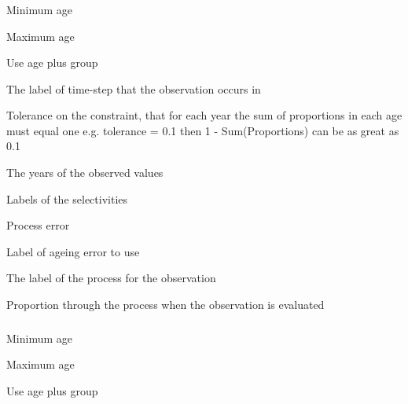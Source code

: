 \subsubsection[Process Proportions At Age]{}

 {Minimum age}

 {Maximum age}

 {Use age plus group}

 {The label of time-step that the observation occurs in}

 {Tolerance on the constraint, that for each year the sum of proportions in each age must equal one e.g. tolerance = 0.1 then 1 - Sum(Proportions) can be as great as 0.1}

 {The years of the observed values}

 {Labels of the selectivities}

 {Process error}

 {Label of ageing error to use}

 {The label of the process for the observation}

 {Proportion through the process when the observation is evaluated}

\subsubsection[Proportions At Age]{}

 {Minimum age}

 {Maximum age}

 {Use age plus group}

